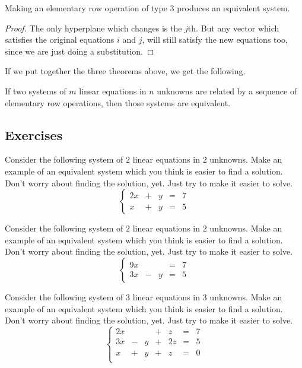 \documentclass[elementsmain.tex]{subfiles}
\begin{document}
\begin{theorem}
Making an elementary row operation of type 3 produces an equivalent system.
\end{theorem}

\begin{proof}
The only hyperplane which changes is the $j$th. But any vector which satisfies the original equations $i$ and $j$, will still satisfy the new equations too, since we are just doing a substitution.
\end{proof}

If we put together the three theorems above, we get the following.

\begin{theorem} If two systems of $m$ linear equations in $n$ unknowns are related by a sequence of elementary row operations, then those systems are equivalent.
\end{theorem}


\clearpage

\subsection*{Exercises}

\begin{exercise} Consider the following system of $2$ linear equations in $2$ unknowns. Make an example of an equivalent system which you think is easier to find a solution. Don't worry about finding the solution, yet. Just try to make it easier to solve.
\[
\left\{\begin{array}{rrrrr}
2x & + & y & = & 7 \\
x & + & y & = & 5
\end{array}\right.
\]
\end{exercise}

\begin{exercise} Consider the following system of $2$ linear equations in $2$ unknowns. Make an example of an equivalent system which you think is easier to find a solution.
Don't worry about finding the solution, yet. Just try to make it easier to solve.
\[
\left\{\begin{array}{rrrrr}
9x &  &   & = & 7 \\
3x & - & y & = & 5
\end{array}\right.
\]
\end{exercise}

\begin{exercise} Consider the following system of $3$ linear equations in $3$ unknowns. Make an example of an equivalent system which you think is easier to find a solution.
Don't worry about finding the solution, yet. Just try to make it easier to solve.
\[
\left\{\begin{array}{rrrrrrr}
2x &  &   & + & z & = & 7 \\
3x & - & y & + & 2z & = & 5 \\
x & + & y & + & z & = & 0 \\
\end{array}\right.
\]
\end{exercise}
\end{document}
